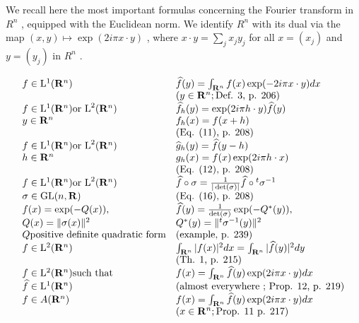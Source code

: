 
We recall here the most important formulas concerning the Fourier transform in \(R^{n}\) , equipped with the Euclidean norm. We identify \(R^{n}\) with its dual via the map \((x,y)\mapsto\exp(2i\pi x\cdot y)\) , where \(x\cdot y=\sum_{j}x_{j}y_{j}\) for all \(x=(x_{j})\) and \(y=(y_{j})\) in \(R^{n}\) .

\[
\begin{array}{l l} f \in \mathrm{L} ^ {1} (\mathbf {R} ^ {n}) & \widehat {f} (y) = \int_ {\mathbf {R} ^ {n}} f (x) \exp (- 2 i \pi x \cdot y) d x \\ & (y \in \mathbf {R} ^ {n}; \text {Def. 3, p. 206}) \\ f \in \mathrm{L} ^ {1} (\mathbf {R} ^ {n}) \text {or L} ^ {2} (\mathbf {R} ^ {n}) & \widehat {f} _ {h} (y) = \exp (2 i \pi h \cdot y) \widehat {f} (y) \\ y \in \mathbf {R} ^ {n} & f _ {h} (x) = f (x + h) \\ & (\text {Eq. (11), p. 208}) \\ f \in \mathrm{L} ^ {1} (\mathbf {R} ^ {n}) \text {or L} ^ {2} (\mathbf {R} ^ {n}) & \widehat {g} _ {h} (y) = \widehat {f} (y - h) \\ h \in \mathbf {R} ^ {n} & g _ {h} (x) = f (x) \exp (2 i \pi h \cdot x) \\ & (\text {Eq. (12), p. 208}) \\ f \in \mathrm{L} ^ {1} (\mathbf {R} ^ {n}) \text {or L} ^ {2} (\mathbf {R} ^ {n}) & \widehat {f} \circ \sigma = \frac {1}{| \det (\sigma) |} \widehat {f} \circ {} ^ {t} \sigma^ {- 1} \\ \sigma \in \mathrm{GL} (n, \mathbf {R}) & (\text {Eq. (16), p. 208}) \\ f (x) = \exp (- Q (x)), & \widehat {f} (y) = \frac {1}{\det (\sigma)} \exp (- Q ^ {*} (y)), \\ Q (x) = \| \sigma (x) \| ^ {2} & Q ^ {*} (y) = \| ^ {t} \sigma^ {- 1} (y) \| ^ {2} \\ Q \text {positive definite quadratic form} & (\text {example, p. 239}) \\ f \in \mathrm{L} ^ {2} (\mathbf {R} ^ {n}) & \int_ {\mathbf {R} ^ {n}} | f (x) | ^ {2} d x = \int_ {\mathbf {R} ^ {n}} | \widehat {f} (y) | ^ {2} d y \\ & (\text {Th. 1, p. 215}) \\ f \in \mathrm{L} ^ {2} (\mathbf {R} ^ {n}) \text {such that} & f (x) = \int_ {\mathbf {R} ^ {n}} \widehat {f} (y) \exp (2 i \pi x \cdot y) d x \\ \widehat {f} \in \mathrm{L} ^ {1} (\mathbf {R} ^ {n}) & (\text {almost everywhere ; Prop. 12, p. 219}) \\ f \in A (\mathbf {R} ^ {n}) & f (x) = \int_ {\mathbf {R} ^ {n}} \widehat {f} (y) \exp (2 i \pi x \cdot y) d x \\ & (x \in \mathbf {R} ^ {n}; \text {Prop. 11 p. 217}) \end{array}
\]

